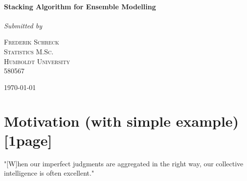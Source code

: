 \documentclass[12pt]{article}
\begin{document}
\begin{titlepage}
	\center
	\HRule\\[0.4cm]
	
	{\LARGE\bfseries Stacking Algorithm for Ensemble Modelling}\\[0.05cm] %
		\HRule\\[1.5cm]
	
			
			\textit{Submitted by}\\	
			\vspace{0.5cm}
			

	\begin{minipage}{0.5\textwidth}
		\begin{center}
			\large

			\textsc{Frederik Schreck \\
			Statistics M.Sc.\\
			Humboldt University\\
			580567} %
		\end{center}

	\end{minipage}
	

	\vfill\vfill\vfill\vfill %
	
	{\large\today} %
	
	\vfill %
	
\end{titlepage}


\tableofcontents
\thispagestyle{empty}
\clearpage
\setcounter{page}{1}
\newpage

\listoffigures
\listoftables
\thispagestyle{empty}
\clearpage
\setcounter{page}{1}


\section{Motivation (with simple example)[1page]}\label{Intro}
"[W]hen our imperfect judgments are aggregated in the right way, our collective intelligence is often excellent."\citep[Foreword p.XIV]{surowiecki2005wisdom}\\
\end{document}
